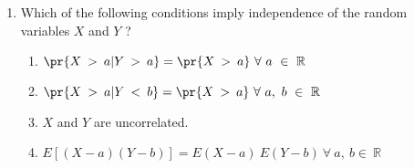 \renewcommand{\theequation}{\theenumi}
\renewcommand{\thefigure}{\theenumi}
\renewcommand{\thetable}{\theenumi}
\begin{enumerate}[label=\thesection.\arabic*.,ref=\thesection.\theenumi]


\item Which of the following conditions imply independence of the random variables $X$
and $Y$ ?\\
\begin{enumerate}
    \item  $\pr{X\ \mathop{>}\ a|Y\ \mathop{>}\ a} = \pr{X\ \mathop{>}\ a}\ \forall\ a\ \in\ \mathbb{R}$\\ 
    \item  $\pr{X\ \mathop{>}\ a|Y\ \mathop{<}\ b} = \pr{X\ \mathop{>}\ a}\ \forall\ a,\ b\ \in\ \mathbb{R}$\\ 
    \item  $X$ and $Y$ are uncorrelated.\\
    \item  $E[(X-a)(Y-b)] = E(X-a)\ E(Y-b)\ \forall\ a,\ b \in\ \mathbb{R}$\\
\end{enumerate}

\end{enumerate}